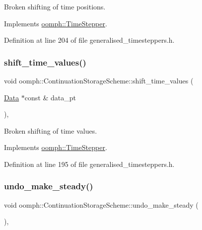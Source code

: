 Broken shifting of time positions. 



Implements \hyperlink{classoomph_1_1TimeStepper_a518b1bee5dc3aae8c5ef13560d1954ac}{oomph\+::\+Time\+Stepper}.



Definition at line 204 of file generalised\+\_\+timesteppers.\+h.

\mbox{\label{classoomph_1_1ContinuationStorageScheme_a74f8d1b2ca6413edfa6fe4a5110a215f}} 
\subsubsection{\texorpdfstring{shift\+\_\+time\+\_\+values()}{shift\_time\_values()}}
{\footnotesize\ttfamily void oomph\+::\+Continuation\+Storage\+Scheme\+::shift\+\_\+time\+\_\+values (\begin{DoxyParamCaption}\item[{\hyperlink{classoomph_1_1Data}{Data} $\ast$const \&}]{data\+\_\+pt }\end{DoxyParamCaption})\hspace{0.3cm}{\ttfamily [inline]}, {\ttfamily [virtual]}}



Broken shifting of time values. 



Implements \hyperlink{classoomph_1_1TimeStepper_a010a3b03a23a1c48dd8ca10641427255}{oomph\+::\+Time\+Stepper}.



Definition at line 195 of file generalised\+\_\+timesteppers.\+h.

\mbox{\label{classoomph_1_1ContinuationStorageScheme_adf4be6b7cf66d8b8f4dfed7520d43afb}} 
\subsubsection{\texorpdfstring{undo\+\_\+make\+\_\+steady()}{undo\_make\_steady()}}
{\footnotesize\ttfamily void oomph\+::\+Continuation\+Storage\+Scheme\+::undo\+\_\+make\+\_\+steady (\begin{DoxyParamCaption}{ }\end{DoxyParamCaption})\hspace{0.3cm}{\ttfamily [inline]}, {\ttfamily [virtual]}}



